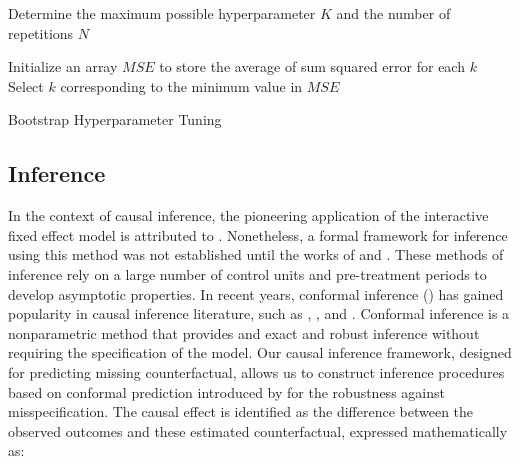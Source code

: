 \documentclass[12pt]{article}
\begin{document}
\begin{algorithm}[!ht]
    \SetAlgoLined
    Determine the maximum possible hyperparameter $K$ and the number of repetitions $N$\;

    Initialize an array $MSE$ to store the average of sum squared error for each $k$\;
    Select $k$ corresponding to the minimum value in $MSE$\;
    \caption{Bootstrap Hyperparameter Tuning}
    \label{algorithm: 1}
\end{algorithm}

\subsection{Inference}

In the context of causal inference, the pioneering application of the interactive fixed effect model is attributed to \cite{hsiao2012panel}. Nonetheless, a formal framework for inference using this method was not established until the works of \cite{chan2016policy} and \cite{li2018inference}. These methods of inference rely on a large number of control units and pre-treatment periods to develop asymptotic properties. In recent years, conformal inference (\cite{chernozhukov2021exact}) has gained popularity in causal inference literature, such as \cite{ben2021augmented}, \cite{roth2023s}, and \cite{imbens2024causal}. Conformal inference is a nonparametric method that provides and exact and robust inference without requiring the specification of the model. Our causal inference framework, designed for predicting missing counterfactual, allows us to construct inference procedures based on conformal prediction introduced by \cite{shafer2008tutorial} for the robustness against misspecification. The causal effect is identified as the difference between the observed outcomes and these estimated counterfactual, expressed mathematically as:
\end{document}
